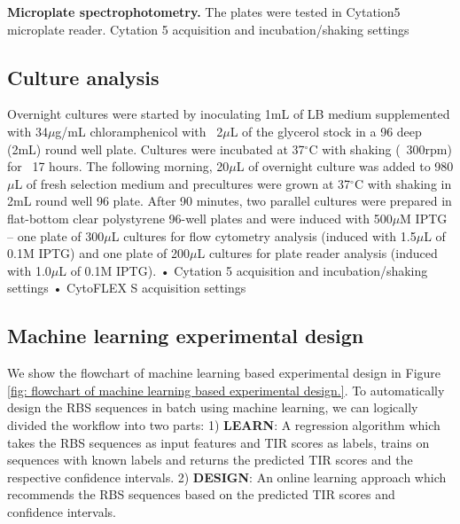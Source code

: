 \textbf{Microplate spectrophotometry.}
The plates were tested in Cytation5 microplate reader.
Cytation 5 acquisition and incubation/shaking settings

\subsection{Culture analysis}
Overnight cultures were started by inoculating 1mL of LB medium supplemented with 34$\mu$g/mL chloramphenicol with ~2$\mu$L of the glycerol stock in a 96 deep (2mL) round well plate. Cultures were incubated at 37$^{\circ}$C with shaking (~300rpm) for ~17 hours. The following morning, 20$\mu$L of overnight culture was added to 980$\mu$L of fresh selection medium and precultures were grown at 37$^{\circ}$C with shaking in 2mL round well 96 plate. 
After 90 minutes, two parallel cultures were prepared in flat-bottom clear polystyrene 96-well plates and were induced with 500$\mu$M IPTG – one plate of 300$\mu$L cultures for flow cytometry analysis (induced with 1.5$\mu$L of 0.1M IPTG) and one plate of 200$\mu$L cultures for plate reader analysis (induced with 1.0$\mu$L of 0.1M IPTG).
•	Cytation 5 acquisition and incubation/shaking settings
•	CytoFLEX S acquisition settings

\subsection{Machine learning experimental design}

We show the flowchart of machine learning based experimental design in Figure \ref{fig: flowchart of machine learning based experimental design.}. 
To automatically design the RBS sequences in batch using machine learning, we can logically divided the workflow into two parts: 
1) \textbf{LEARN}: A regression algorithm which takes the RBS sequences as input features and TIR scores as labels, trains on sequences with known labels and returns the predicted TIR scores and the respective confidence intervals. 
2) \textbf{DESIGN}: An online learning approach which recommends the RBS sequences based on the predicted TIR scores and confidence intervals. 



